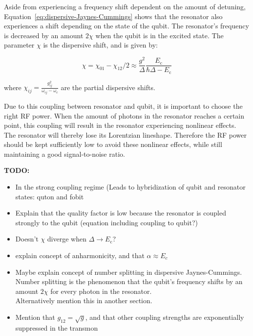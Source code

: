 \documentclass[12pt]{report}
\newcommand{\Ec}{E_\text{c}}
\begin{document}
        Aside from experiencing a frequency shift dependent on the amount of detuning, Equation~\ref{eq:dispersive-Jaynes-Cummings} shows that the resonator also experiences a shift depending on the state of the qubit. The resonator's frequency is decreased by an amount $2 \chi$ when the qubit is in the excited state. The parameter $\chi$ is the dispersive shift, and is given by:

        \begin{equation}
          \chi = \chi_{01} - \chi_{12}/2 \approx \frac{g^2}{\Delta}\frac{\Ec}{\hbar \Delta - \Ec}
          \label{eq:dispersive-shift}
        \end{equation}

        where $\chi_{ij} = \frac{g_{ij}^2}{\omega_{ij}-\omega_c}$ are the partial dispersive shifts.

        Due to this coupling between resonator and qubit, it is important to choose the right RF power. When the amount of photons in the resonator reaches a certain point, this coupling will result in the resonator experiencing nonlinear effects. The resonator will thereby lose its Lorentzian lineshape. Therefore the RF power should be kept sufficiently low to avoid these nonlinear effects, while still maintaining a good signal-to-noise ratio.



        \textbf{TODO:}
        \begin{itemize}
          \item In the strong coupling regime (Leads to hybridization of qubit and resonator states: quton and fobit
          \item Explain that the quality factor is low because the resonator is coupled strongly to the qubit (equation including coupling to qubit?)
          \item Doesn't $\chi$ diverge when $\Delta \rightarrow \Ec$?
          \item explain concept of anharmonicity, and that $\alpha \approx E_c$
          \item Maybe explain concept of number splitting in dispersive Jaynes-Cummings. Number splitting is the phenomenon that the qubit's frequency shifts by an amount $2 \chi$ for every photon in the resonator.\\
                Alternatively mention this in another section.
          \item Mention that $g_{12}=\sqrt{g}$, and that other coupling strengths are exponentially suppressed in the transmon
        \end{itemize}
\end{document}
